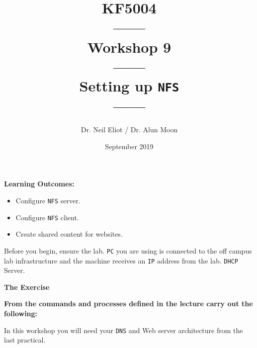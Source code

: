\documentclass[11pt]{article}
\begin{document}
\author{Dr. Neil Eliot / Dr. Alun Moon}
\title{KF5004\\------\\Workshop 9\\------\\Setting up \texttt{NFS}\\------}
\date{September 2019}
\maketitle

\newpage



\noindent\textbf{Learning Outcomes:}
\begin{itemize}
    \item Configure \texttt{NFS} server.
    \item Configure \texttt{NFS} client.
    \item Create shared content for websites.
\end{itemize}


\begin{tcolorbox}[title={\textbf{Important:}}]
    Before you begin, ensure the lab. \texttt{PC} you are using is connected to the off campus lab infrastructure and the machine receives an \texttt{IP} address from the lab. \texttt{DHCP} Server.
\end{tcolorbox}
\newpage

\noindent\textbf{The Exercise}\\
\begin{tcolorbox}[colback=blue!20]
    \noindent\textbf{From the commands and processes defined in the lecture carry out the following:}
\end{tcolorbox}


\begin{tcolorbox}[title={\textbf{NOTE:}}]
    In this workshop you will need your \texttt{DNS} and Web server architecture from the last practical.
\end{tcolorbox}
\end{document}
